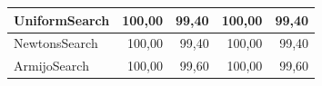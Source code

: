 \documentclass[a4paper,english,titlepage,12pt]{article}
\begin{document}
\begin{table}[H]
\begin{tabular}{|l|r|r|r|r|}
    UniformSearch                                                             & 100,00                                                   & \cellcolor[HTML]{F7D9D7}99,40                             & 100,00                                                    & \cellcolor[HTML]{F7D9D7}99,40                             \\ \hline
    NewtonsSearch                                                             & 100,00                                                   & \cellcolor[HTML]{F7D9D7}99,40                             & 100,00                                                    & \cellcolor[HTML]{F7D9D7}99,40                             \\ \hline
    ArmijoSearch                                                              & 100,00                                                   & 99,60                                                     & 100,00                                                    & 99,60                                                     \\ \hline
    \end{tabular}
\end{table}
\end{document}
